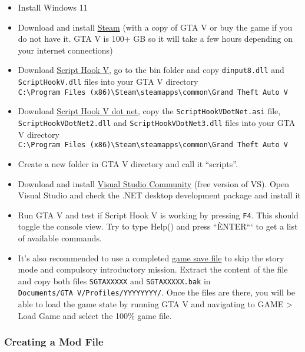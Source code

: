 \documentclass[
  openany]{book}
\begin{document}
\begin{itemize}
\item
  Install Windows 11
\item
  Download and install \href{https://store.steampowered.com/about/}{Steam} (with a copy of GTA V or buy the game if you do not have it. GTA V is 100+ GB so it will take a few hours depending on your internet connections)
\item
  Download \href{https://www.gta5-mods.com/tools/script-hook-v}{Script Hook V}, go to the bin folder and copy \texttt{dinput8.dll} and \texttt{ScriptHookV.dll} files into your GTA V directory \texttt{C:\textbackslash{}Program\ Files\ (x86)\textbackslash{}Steam\textbackslash{}steamapps\textbackslash{}common\textbackslash{}Grand\ Theft\ Auto\ V}
\item
  Download \href{https://github.com/crosire/scripthookvdotnet/releases}{Script Hook V dot net}, copy the \texttt{ScriptHookVDotNet.asi} file, \texttt{ScriptHookVDotNet2.dll} and \texttt{ScriptHookVDotNet3.dll} files into your GTA V directory \texttt{C:\textbackslash{}Program\ Files\ (x86)\textbackslash{}Steam\textbackslash{}steamapps\textbackslash{}common\textbackslash{}Grand\ Theft\ Auto\ V}
\item
  Create a new folder in GTA V directory and call it ``scripts''.
\item
  Download and install \href{https://visualstudio.microsoft.com/vs/community/}{Visual Studio Community} (free version of VS). Open Visual Studio and check the .NET desktop development package and install it
\item
  Run GTA V and test if Script Hook V is working by pressing \texttt{F4}. This should toggle the console view. Try to type Help() and press ``ÈNTER``` to get a list of available commands.
\item
  It's also recommended to use a completed \href{https://www.gta5-mods.com/misc/100-save-game}{game save file} to skip the story mode and compulsory introductory mission. Extract the content of the file and copy both files \texttt{SGTAXXXXX} and \texttt{SGTAXXXXX.bak} in \texttt{Documents/GTA\ V/Profiles/YYYYYYYY/}. Once the files are there, you will be able to load the game state by running GTA V and navigating to GAME \textgreater{} Load Game and select the 100\% game file.
\end{itemize}

\hypertarget{creating-a-mod-file}{%
\subsubsection*{Creating a Mod File}\label{creating-a-mod-file}}
\end{document}
